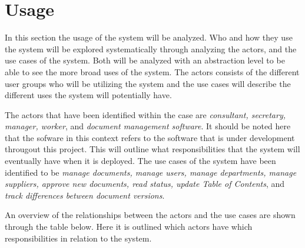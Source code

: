 \section{Usage}

In this section the usage of the system will be analyzed. Who and how they use the system will be explored systematically through analyzing the actors, and the use cases of the system.
Both will be analyzed with an abstraction level to be able to see the more broad uses of the system.
The actors consists of the different user groups who will be utilizing the system and the use cases will describe the different uses the system will potentially have.

The actors that have been identified within the case are \textit{consultant, secretary, manager, worker}, and \textit{document management software}.
It should be noted here that the sofware in this context refers to the software that is under development througout this project.
This will outline what responsibilities that the system will eventually have when it is deployed.
The use cases of the system have been identified to be \textit{manage documents, manage users, manage departments, manage suppliers, approve new documents, read status, update Table of Contents}, and \textit{track differences between document versions}.

An overview of the relationships between the actors and the use cases are shown through the table below. Here it is outlined which actors have which responsibilities in relation to the system.

